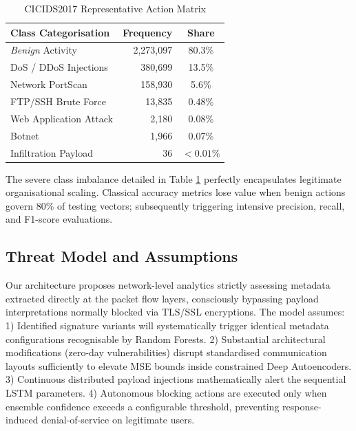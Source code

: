 \documentclass[conference]{IEEEtran}
\begin{document}
\begin{table}[htbp]
\caption{CICIDS2017 Representative Action Matrix}
\begin{center}
\renewcommand{\arraystretch}{1.2}
\begin{tabular}{|l|r|c|}
    \hline
    \textbf{Class Categorisation} & \textbf{Frequency} & \textbf{Share} \\
    \hline
    \textit{Benign} Activity & 2,273,097 & 80.3\% \\
    DoS / DDoS Injections & 380,699 & 13.5\% \\
    Network PortScan & 158,930 & 5.6\% \\
    FTP/SSH Brute Force & 13,835 & 0.48\% \\
    Web Application Attack & 2,180 & 0.08\% \\
    Botnet & 1,966 & 0.07\% \\
    Infiltration Payload & 36 & $<0.01$\% \\
    \hline
\end{tabular}
\label{tab:dataset}
\end{center}
\end{table}

The severe class imbalance detailed in Table \ref{tab:dataset} perfectly encapsulates legitimate organisational scaling. Classical accuracy metrics lose value when benign actions govern 80\% of testing vectors; subsequently triggering intensive precision, recall, and F1-score evaluations.

\subsection{Threat Model and Assumptions}
Our architecture proposes network-level analytics strictly assessing metadata extracted directly at the packet flow layers, consciously bypassing payload interpretations normally blocked via TLS/SSL encryptions. The model assumes:
1) Identified signature variants will systematically trigger identical metadata configurations recognisable by Random Forests.
2) Substantial architectural modifications (zero-day vulnerabilities) disrupt standardised communication layouts sufficiently to elevate MSE bounds inside constrained Deep Autoencoders.
3) Continuous distributed payload injections mathematically alert the sequential LSTM parameters.
4) Autonomous blocking actions are executed only when ensemble confidence exceeds a configurable threshold, preventing response-induced denial-of-service on legitimate users.
\end{document}
